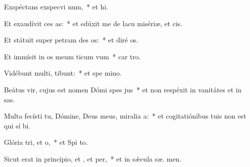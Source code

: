\item Exspéctans exspecvi num,~* et  hi.
\item Et exaudívit ces as:~* et edúxit me de lacu misériæ, et   cis.
\item Et státuit super petram des os:~* et diré  os.
\item Et immísit in os meum ticum vum~* car  tro.
\item Vidébunt multi,  tibunt:~* et spe  mino.
\item Beátus vir, cujus est nomen Dómi spes jus~* et non respéxit in vanitátes et in sas.
\item Multa fecísti tu, Dómine, Deus meus, miralia a:~* et cogitatiónibus tuis non est qui sí  bi.
\item Glória tri, et o,~* et Spi to.
\item Sicut erat in princípio, et , et per,~* et in sǽcula sæ. men.
